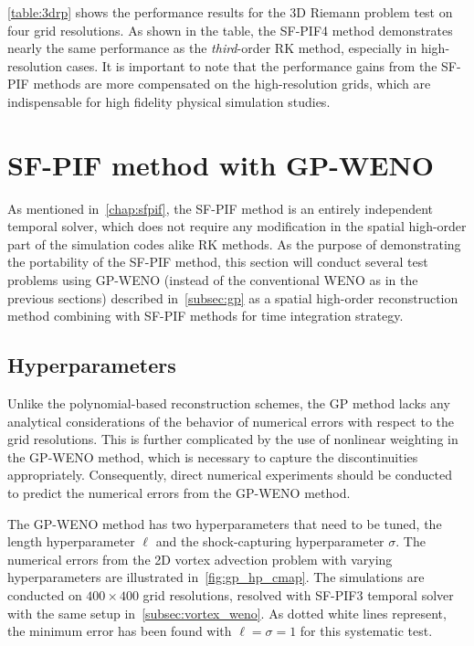 \cref{table:3drp} shows the performance results for the 3D Riemann problem test
on four grid resolutions.
As shown in the table, the SF-PIF4 method demonstrates nearly the same performance
as the \textit{third}-order RK method, especially in high-resolution cases.
It is important to note that the performance gains from the SF-PIF methods
are more compensated on the high-resolution grids,
which are indispensable for high fidelity physical simulation studies.

\section{SF-PIF method with GP-WENO}\label{sec:result_gpweno}

As mentioned in~\cref{chap:sfpif}, the SF-PIF method is an entirely independent temporal solver,
which does not require any modification in the spatial high-order part of the simulation codes
alike RK methods.
As the purpose of demonstrating the portability of the SF-PIF method,
this section will conduct several test problems using GP-WENO
(instead of the conventional WENO as in the previous sections) described in~\cref{subsec:gp}
as a spatial high-order reconstruction method
combining with SF-PIF methods for time integration strategy.

\subsection{Hyperparameters}\label{subsec:hyper_params_gpweno}

Unlike the polynomial-based reconstruction schemes,
the GP method lacks any analytical considerations of the behavior of numerical errors
with respect to the grid resolutions.
This is further complicated by the use of nonlinear weighting in the GP-WENO method,
which is necessary to capture the discontinuities appropriately.
Consequently, direct numerical experiments
should be conducted to predict the numerical errors from the GP-WENO method.

The GP-WENO method has two hyperparameters that need to be tuned,
the length hyperparameter \( \ell \)
and the shock-capturing hyperparameter \( \sigma \).
The numerical errors from the 2D vortex advection problem
with varying hyperparameters are illustrated in~\cref{fig:gp_hp_cmap}.
The simulations are conducted on \( 400 \times 400 \) grid resolutions,
resolved with SF-PIF3 temporal solver
with the same setup in~\cref{subsec:vortex_weno}.
As dotted white lines represent,
the minimum error has been found with \( \ell = \sigma = 1\)
for this systematic test.

